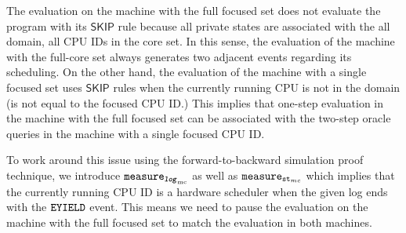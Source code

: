 The evaluation on the machine with the full focused set does not evaluate the program with its $\textsf{SKIP}$ rule because all private states are associated with the all domain, all CPU IDs in the core set. 
In this sense, the evaluation of the machine with the full-core set always generates two adjacent events regarding its scheduling. 
On the other hand, the evaluation of the machine with a single focused set uses 
$\textsf{SKIP}$ rules when the currently running CPU is not in the domain (is not equal to the focused CPU ID.)
This implies that one-step evaluation in the machine with the full focused set 
can be associated with the two-step oracle queries in the machine with a single focused CPU ID.

To work around this issue  using the forward-to-backward simulation proof technique, 
we introduce ${{\mathrm{\texttt{measure}}}_{{{\mathrm{\texttt{\textbf{\textit{log}}}}}_{\mathrm{mc}}}}}$ as well as ${{\mathrm{\texttt{measure}}}_{{\mathrm{\texttt{st}}}_{mc}}}$ which implies that 
the currently running CPU ID is a hardware scheduler when the given log ends with the ${{\mathrm{\texttt{EYIELD}}}}$ event. This means  we need to pause the evaluation on the machine with the full focused set to match the evaluation in both machines.

